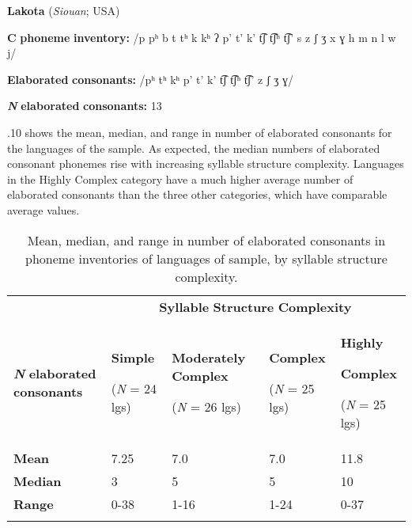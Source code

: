 \ea\label{ex:(4.26)}
  \textbf{Lakota} (\textit{Siouan}; USA)



\textbf{C} \textbf{phoneme} \textbf{inventory:} /p pʰ b t tʰ k kʰ ʔ p’ t’ k’ t͡ʃ t͡ʃʰ t͡ʃ’ s z ʃ ʒ x ɣ h m n l w j/



\textbf{Elaborated} \textbf{consonants:} /pʰ tʰ kʰ p’ t’ k’ t͡ʃ t͡ʃʰ t͡ʃ’ z ʃ ʒ ɣ/



\textbf{\textit{N}} \textbf{elaborated} \textbf{consonants:} 13
\z



  .10 shows the mean, median, and range in number of elaborated consonants for the languages of the sample. As expected, the median numbers of elaborated consonant phonemes rise with increasing syllable structure complexity. Languages in the Highly Complex category have a much higher average number of elaborated consonants than the three other categories, which have comparable average values.






\begin{table}
\begin{tabularx}{\textwidth}{XXXXX}
 & \multicolumn{4}{c}{ \textbf{Syllable} \textbf{Structure} \textbf{Complexity}}\\
\lsptoprule
\textbf{\textit{N}} \textbf{elaborated} \textbf{consonants} & { \textbf{Simple}}

 (\textit{N} = 24 lgs) & { \textbf{Moderately} \textbf{Complex}}

 (\textit{N} = 26 lgs) & { \textbf{Complex}}

 (\textit{N} = 25 lgs) & { \textbf{Highly} }

{ \textbf{Complex}}

 (\textit{N} = 25 lgs)\\
\textbf{Mean} & 7.25 & 7.0 & 7.0 & 11.8\\
\textbf{Median} & 3 & 5 & 5 & 10\\
\textbf{Range} & 0-38 & 1-16 & 1-24 & 0-37\\
\lspbottomrule
\end{tabularx}
\caption{\label{4.10}Mean, median, and range in number of elaborated consonants in phoneme inventories of languages of sample, by syllable structure complexity.}
\end{table}




